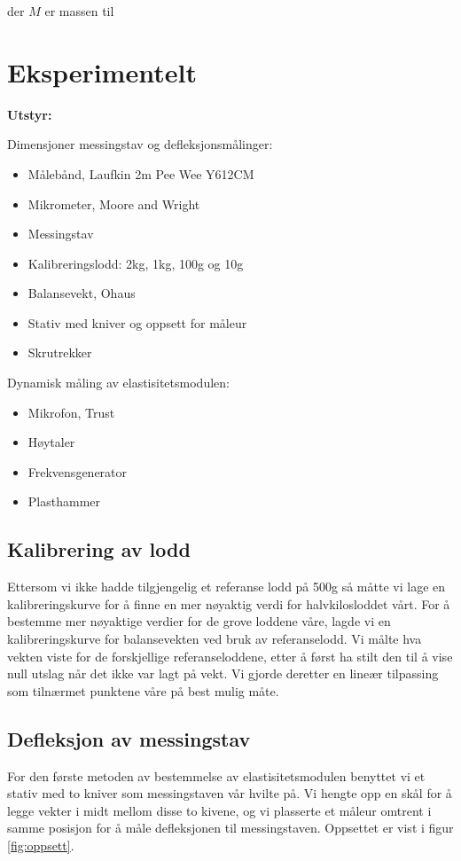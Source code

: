 \documentclass[a4paper,11pt, twocolumn]{article}
\begin{document}
der $M$ er massen til 

\section{Eksperimentelt}
{\bf Utstyr:}

Dimensjoner messingstav og defleksjonsmålinger:
\begin{itemize}
	\item Målebånd, Laufkin 2m Pee Wee Y612CM
	\item Mikrometer, Moore and Wright
	\item Messingstav
	\item Kalibreringslodd: 2kg, 1kg, 100g og 10g
	\item Balansevekt, Ohaus
	\item Stativ med kniver og oppsett for måleur
	\item Skrutrekker
\end{itemize}

Dynamisk måling av elastisitetsmodulen:
\begin{itemize}
	\item Mikrofon, Trust
	\item Høytaler 
	\item Frekvensgenerator 
	\item Plasthammer
\end{itemize}

\subsection{Kalibrering av lodd}
Ettersom vi ikke hadde tilgjengelig et referanse lodd på 500g så måtte vi lage en kalibreringskurve for å finne en mer nøyaktig verdi for halvkilosloddet vårt. For å bestemme mer nøyaktige verdier for de grove loddene våre, lagde vi en kalibreringskurve for balansevekten ved bruk av referanselodd. Vi målte hva vekten viste for de forskjellige referanseloddene, etter å først ha stilt den til å vise null utslag når det ikke var lagt på vekt. Vi gjorde deretter en lineær tilpassing som tilnærmet punktene våre på best mulig måte.

\subsection{Defleksjon av messingstav}
For den første metoden av bestemmelse av elastisitetsmodulen benyttet vi et stativ med to kniver som messingstaven vår hvilte på. Vi hengte opp en skål for å legge vekter i midt mellom disse to kivene, og vi plasserte et måleur omtrent i samme posisjon for å måle defleksjonen til messingstaven. Oppsettet er vist i figur \ref{fig:oppsett}.
\end{document}
